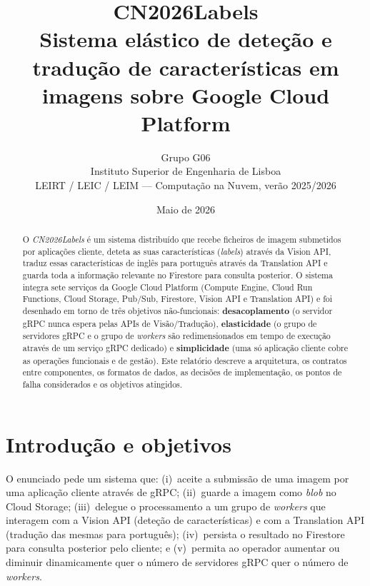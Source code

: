 \documentclass[11pt,a4paper]{article}
\title{\textbf{CN2026Labels} \\[2pt]
       \large Sistema el\'astico de dete\c{c}\~ao e tradu\c{c}\~ao de
       caracter\'isticas em imagens sobre Google Cloud Platform}
\author{Grupo G06 \\
        Instituto Superior de Engenharia de Lisboa \\
        LEIRT / LEIC / LEIM --- Computa\c{c}\~ao na Nuvem, ver\~ao 2025/2026}
\date{Maio de 2026}
\begin{document}
\maketitle

\begin{abstract}
\noindent
O \emph{CN2026Labels} \'e um sistema distribu\'ido que recebe ficheiros de
imagem submetidos por aplica\c{c}\~oes cliente, deteta as suas
caracter\'isticas (\emph{labels}) atrav\'es da Vision API, traduz essas
caracter\'isticas de ingl\^es para portugu\^es atrav\'es da Translation API e
guarda toda a informa\c{c}\~ao relevante no Firestore para consulta
posterior. O sistema integra sete servi\c{c}os da Google Cloud Platform
(Compute Engine, Cloud Run Functions, Cloud Storage, Pub/Sub, Firestore,
Vision API e Translation API) e foi desenhado em torno de tr\^es
objetivos n\~ao-funcionais: \textbf{desacoplamento} (o servidor gRPC
nunca espera pelas APIs de Vis\~ao/Tradu\c{c}\~ao), \textbf{elasticidade}
(o grupo de servidores gRPC e o grupo de \emph{workers} s\~ao
redimensionados em tempo de execu\c{c}\~ao atrav\'es de um servi\c{c}o gRPC
dedicado) e \textbf{simplicidade} (uma s\'o aplica\c{c}\~ao cliente cobre as
opera\c{c}\~oes funcionais e de gest\~ao).
Este relat\'orio descreve a arquitetura, os contratos entre componentes,
os formatos de dados, as decis\~oes de implementa\c{c}\~ao, os pontos de
falha considerados e os objetivos atingidos.
\end{abstract}

\tableofcontents
\vspace{1em}

\section{Introdu\c{c}\~ao e objetivos}
\label{sec:objetivos}

O enunciado pede um sistema que: (i)~aceite a submiss\~ao de uma imagem
por uma aplica\c{c}\~ao cliente atrav\'es de gRPC; (ii)~guarde a imagem como
\emph{blob} no Cloud Storage; (iii)~delegue o processamento a um grupo
de \emph{workers} que interagem com a Vision API (dete\c{c}\~ao de
caracter\'isticas) e com a Translation API (tradu\c{c}\~ao das mesmas para
portugu\^es); (iv)~persista o resultado no Firestore para consulta
posterior pelo cliente; e (v)~permita ao operador aumentar ou diminuir
dinamicamente quer o n\'umero de servidores gRPC quer o n\'umero de
\emph{workers}.
\end{document}

